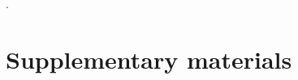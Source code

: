 \documentclass[12pt,a4paper]{article}
\begin{document}






.





\clearpage

\singlespacing




\newpage

\section*{Supplementary materials}
\end{document}
